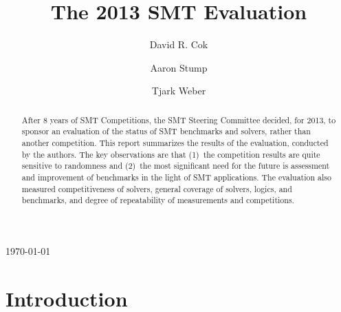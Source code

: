 \documentclass{eptcs}
\begin{document}
\title{The 2013 SMT Evaluation}


\author{
David R. Cok 
\and  
Aaron Stump 
\and  
Tjark Weber 
}

%

\maketitle
\pagestyle{headings}
\centerline{\today}

\begin{abstract}
After 8 years of SMT Competitions, the SMT Steering Committee decided,
for 2013, to sponsor an evaluation of the status of SMT benchmarks and
solvers, rather than another competition.  This report summarizes the
results of the evaluation, conducted by the authors.  The key
observations are that (1)~the competition results are quite sensitive
to randomness and (2)~the most significant need for the future is
assessment and improvement of benchmarks in the light of SMT
applications.  The evaluation also measured competitiveness of
solvers, general coverage of solvers, logics, and benchmarks, and
degree of repeatability of measurements and competitions.
\end{abstract}


\section{Introduction}
\end{document}
